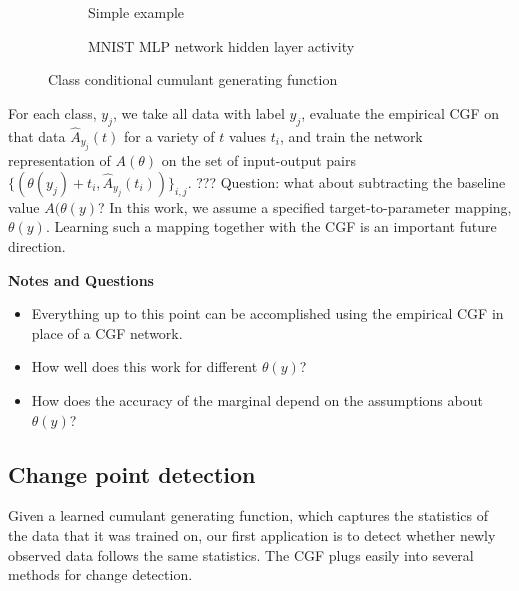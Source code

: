 \documentclass[11pt]{article}      %
\begin{document}
\begin{figure}[tb]
  \centering
  \begin{subfigure}[t]{\textwidth}
    \centering
    \caption{Simple example}
    \label{fig:2a_conditional_example}
  \end{subfigure}
  \begin{subfigure}[t]{\textwidth}
    \centering
    \caption{MNIST MLP network hidden layer activity}
    \label{fig:2b_conditional_MNIST}
  \end{subfigure}

  \caption{Class conditional cumulant generating function}
  \label{fig:2_class_conditional}
\end{figure}









For each class, $y_j$, we take all data with label $y_j$, evaluate the empirical CGF on that data $\hat A_{y_j}(t)$ for a variety of $t$ values $t_i$, and train the network representation of $A(\theta)$ on the set of input-output pairs $\{(\theta(y_j) + t_i, \hat A_{y_j}(t_i))\}_{i,j}$.
??? Question: what about subtracting the baseline value $A(\theta(y)$?
In this work, we assume a specified target-to-parameter mapping, $\theta(y)$.
Learning such a mapping together with the CGF is an important future direction.


\noindent \textbf{Notes and Questions}
\begin{itemize}
  \item Everything up to this point can be accomplished using the empirical CGF in place of a CGF network.
  \item How well does this work for different $\theta(y)$?
  \item How does the accuracy of the marginal depend on the assumptions about $\theta(y)$?
\end{itemize}






\newpage
\subsection{Change point detection}
Given a learned cumulant generating function, which captures the statistics of the data that it was trained on, our first application is to detect whether newly observed data follows the same statistics.
The CGF plugs easily into several methods for change detection.
\end{document}
